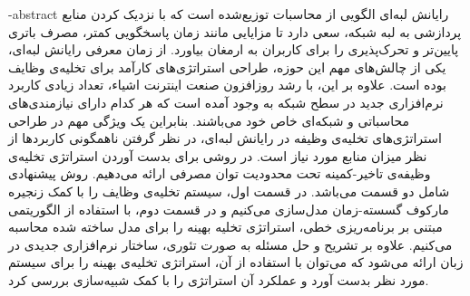 \esalatPage
\mojavezPage

 \newpage

% 
% 
% 
% 
% 
% 
\fa-abstract{
رایانش لبه‌ای الگویی از محاسبات توزیع‌شده است که با نزدیک کردن منابع پردازشی به لبه شبکه، سعی دارد تا مزایایی مانند زمان پاسخگویی کمتر، مصرف باتری پایین‌تر و تحرک‌پذیری را برای کاربران به ارمغان بیاورد. از زمان معرفی رایانش لبه‌ای، یکی از چالش‌های مهم این حوزه، طراحی استراتژی‌های کارآمد برای تخلیه‌ی وظایف بوده است. علاوه بر این، با رشد روزافزون صنعت اینترنت اشیاء، تعداد زیادی کاربرد نرم‌افزاری جدید در سطح شبکه به وجود آمده است که هر کدام دارای نیازمندی‌های محاسباتی و شبکه‌ای خاص خود می‌باشند. بنابراین یک ویژگی مهم در طراحی استراتژی‌های تخلیه‌ی وظیفه در رایانش لبه‌ای، در نظر گرفتن ناهمگونی کاربردها از نظر میزان منابع مورد نیاز است. در \CurrentProject روشی برای بدست آوردن استراتژی تخلیه‌ی وظیفه‌ی تاخیر-کمینه تحت محدودیت توان مصرفی ارائه می‌دهیم. روش پیشنهادی شامل دو قسمت می‌باشد. در قسمت اول، سیستم تخلیه‌ی وظایف را با کمک زنجیره مارکوف گسسته-زمان مدل‌سازی می‌کنیم و در قسمت دوم، با استفاده از الگوریتمی مبتنی بر برنامه‌ریزی خطی، استراتژی تخلیه بهینه را برای مدل ساخته شده محاسبه می‌کنیم. علاوه بر تشریح و حل مسئله به صورت تئوری، ساختار نرم‌افزاری جدیدی در زبان  ارائه می‌شود که می‌توان با استفاده از آن، استراتژی تخلیه‌ی بهینه را برای سیستم مورد نظر بدست آورد و عملکرد آن استراتژی را با کمک شبیه‌سازی بررسی کرد.
}

\abstractPage

\newpage\clearpage